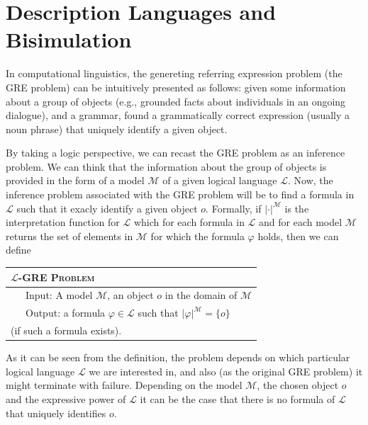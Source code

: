 \newcommand{\gM}{\mathcal{M}}
\newcommand{\gL}{\mathcal{L}}


\section{Description Languages and Bisimulation} \label{sec:bisim}

In computational linguistics, the genereting referring expression problem (the GRE
problem) can be intuitively presented as follows: given some information about
a group of objects (e.g., grounded facts about individuals in an ongoing dialogue),
and a grammar, found a grammatically correct expression (usually a noun phrase) that uniquely identify a given object.

By taking a logic perspective, we can recast the GRE problem as an inference problem.
We can think that the information about the group of objects is provided in the form
of a model $\gM$ of a given logical language $\gL$.  Now, the inference problem
associated with the GRE problem will be to find a formula in $\gL$ such that it
exacly identify a given object $o$.  Formally, if $|\cdot|^\gM$ is the interpretation
function for $\gL$ which for each formula in $\gL$ and for each model $\gM$ returns
the set of elements in $\gM$ for which the formula $\varphi$ holds, then we can define
\medskip

\noindent
{\small
\begin{tabular}{l} \hline
\textsc{$\gL$-GRE Problem}\\ \hline
\ \ \ Input: A model $\gM$, an object $o$ in the domain of $\gM$\\
\ \ \ Output: a formula $\varphi \in \gL$ such that $|\varphi|^\gM = \{o\}$\\
\hspace*{1.4cm} (if such a formula exists).\\ \hline
\end{tabular}}
\medskip

As it can be seen from the definition, the problem depends on which particular
logical language $\gL$ we are interested in, and also (as the original GRE problem)
it might terminate with failure.  Depending on the model $\gM$, the chosen object $o$
and the expressive power of $\gL$ it can be the case that there is no formula of
$\gL$ that uniquely identifies $o$.

